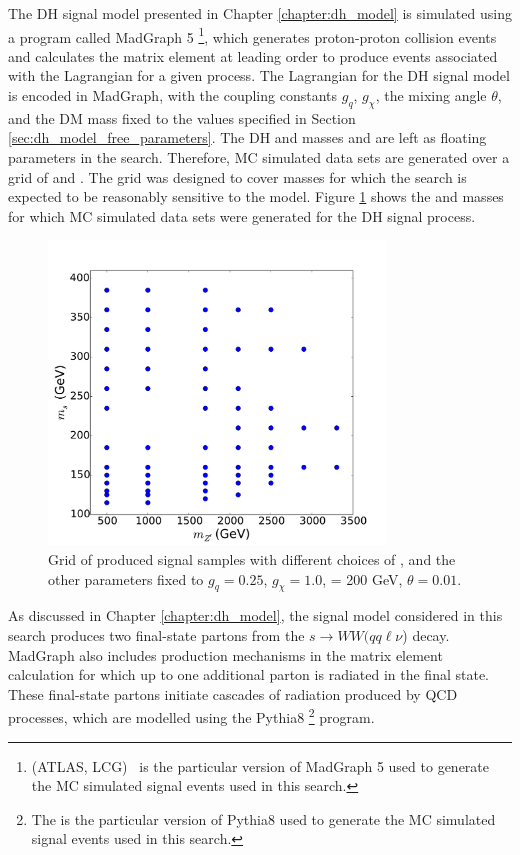 The DH signal model presented in Chapter \ref{chapter:dh_model} is simulated using a program called MadGraph 5 \cite{MG5}\footnote{\MGNLO[2.7.2](ATLAS, LCG)~\cite{Alwall:2014hca} is the particular version of MadGraph 5 used to generate the MC simulated signal events used in this search.}, which generates proton-proton collision events and calculates the matrix element at leading order to produce events associated with the Lagrangian for a given process. The Lagrangian for the DH signal model is encoded in MadGraph, with the coupling constants \(g_q\), \(g_\chi\), the mixing angle \(\theta\), and the DM mass \mchi fixed to the values specified in Section \ref{sec:dh_model_free_parameters}. The DH and \Zprime masses \ms and \mZp are left as floating parameters in the search. Therefore, MC simulated data sets are generated over a grid of \ms and \mZp. The grid was designed to cover masses for which the search is expected to be reasonably sensitive to the model. Figure \ref{fig:signalgrid} shows the \ms and \mZp masses for which MC simulated data sets were generated for the DH signal process. 

\begin{figure}[h]
	\centering
	\includegraphics[width=0.8\textwidth]{Figures/4/Grid.pdf}
	\caption{Grid of produced signal samples with different choices of \mZp, \ms and the other parameters fixed to \(g_{q}=0.25\), \(g_{\chi} = 1.0\), \mchi = 200 GeV, \(\theta = 0.01\).}
	\label{fig:signalgrid}
\end{figure}

As discussed in Chapter \ref{chapter:dh_model}, the signal model considered in this search produces two final-state partons from the \(s \rightarrow WW(qq\ell\nu\)) decay. MadGraph also includes production mechanisms in the matrix element calculation for which up to one additional parton is radiated in the final state. These final-state partons initiate cascades of radiation produced by QCD processes, which are modelled using the Pythia8 \footnote{The \PYTHIA[8.230]\cite{Sjostrand:2014zea} is the particular version of Pythia8 used to generate the MC simulated signal events used in this search.} \cite{Sjostrand:2014zea} program.


